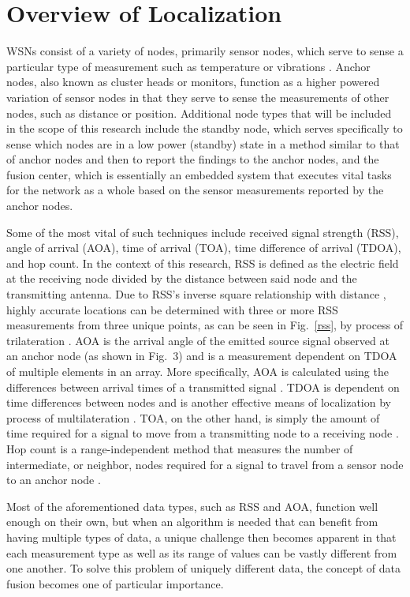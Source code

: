\documentclass[12pt]{uthesis-v12}  %
\begin{document}
\section{Overview of Localization}

WSNs consist of a variety of nodes, primarily sensor nodes, which serve to sense a particular type of measurement such as temperature or vibrations \cite{agrawal}. Anchor nodes, also known as cluster heads or monitors, function as a higher powered variation of sensor nodes in that they serve to sense the measurements of other nodes, such as distance or position. Additional node types that will be included in the scope of this research include the standby node, which serves specifically to sense which nodes are in a low power (standby) state in a method similar to that of anchor nodes and then to report the findings to the anchor nodes, and the fusion center, which is essentially an embedded system that executes vital tasks for the network as a whole based on the sensor measurements reported by the anchor nodes. 

Some of the most vital of such techniques include received signal strength (RSS), angle of arrival (AOA), time of arrival (TOA), time difference of arrival (TDOA), and hop count. In the context of this research, RSS is defined as the electric field at the receiving node divided by the distance between said node and the transmitting antenna. Due to RSS's inverse square relationship with distance \cite{xu}, highly accurate locations can be determined with three or more RSS measurements from three unique points, as can be seen in Fig.~\ref{rss}, by process of trilateration \cite{mazuelas}. AOA is the arrival angle of the emitted source signal observed at an anchor node (as shown in Fig.~3) and is a measurement dependent on TDOA of multiple elements in an array. More specifically, AOA is calculated using the differences between arrival times of a transmitted signal \cite{patwari}. TDOA is dependent on time differences between nodes \cite{cakir} and is another effective means of localization by process of multilateration \cite{pelant}. TOA, on the other hand, is simply the amount of time required for a signal to move from a transmitting node to a receiving node \cite{patwari}. Hop count is a range-independent method that measures the number of intermediate, or neighbor, nodes required for a signal to travel from a sensor node to an anchor node \cite{di}.

Most of the aforementioned data types, such as RSS and AOA, function well enough on their own, but when an algorithm is needed that can benefit from having multiple types of data, a unique challenge then becomes apparent in that each measurement type as well as its range of values can be vastly different from one another. To solve this problem of uniquely different data, the concept of data fusion becomes one of particular importance. 
\end{document}
